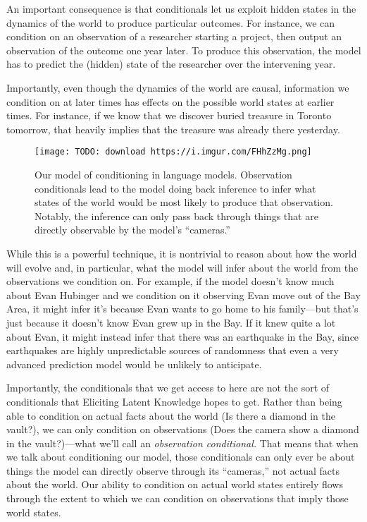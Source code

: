 {An important consequence is that conditionals let us exploit hidden states in the dynamics of the world to produce particular outcomes. For instance, we can condition on an observation of a researcher starting a project, then output an observation of the outcome one year later. To produce this observation, the model has to predict the (hidden) state of the researcher over the intervening year.

Importantly, even though the dynamics of the world are causal, information we condition on at later times has effects on the possible world states at earlier times. For instance, if we know that we discover buried treasure in Toronto tomorrow, that heavily implies that the treasure was already there yesterday.

\begin{figure}[h!]
  \centering
  \texttt{[image: TODO: download https://i.imgur.com/FHhZzMg.png]}
  \caption{Our model of conditioning in language models. Observation conditionals lead to the model doing back inference to infer what states of the world would be most likely to produce that observation. Notably, the inference can only pass back through things that are directly observable by the model's ``cameras.''}
\end{figure}

While this is a powerful technique, it is nontrivial to reason about how the world will evolve and, in particular, what the model will infer about the world from the observations we condition on. For example, if the model doesn't know much about Evan Hubinger and we condition on it observing Evan move out of the Bay Area, it might infer it's because Evan wants to go home to his family---but that's just because it doesn't know Evan grew up in the Bay. If it knew quite a lot about Evan, it might instead infer that there was an earthquake in the Bay, since earthquakes are highly unpredictable sources of randomness that even a very advanced prediction model would be unlikely to anticipate.

Importantly, the conditionals that we get access to here are not the sort of conditionals that Eliciting Latent Knowledge\cite{TODO: cite https://www.alignmentforum.org/posts/qHCDysDnvhteW7kRd/arc-s-first-technical-report-eliciting-latent-knowledge} hopes to get. Rather than being able to condition on actual facts about the world (Is there a diamond in the vault?), we can only condition on observations (Does the camera show a diamond in the vault?)---what we'll call an \textit{observation conditional.} That means that when we talk about conditioning our model, those conditionals can only ever be about things the model can directly observe through its ``cameras,'' not actual facts about the world. Our ability to condition on actual world states entirely flows through the extent to which we can condition on observations that imply those world states.

}
